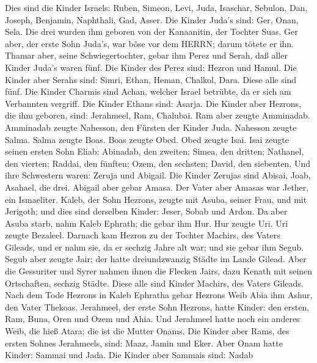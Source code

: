  Dies sind die Kinder Israels: Ruben, Simeon, Levi, Juda,
Isaschar, Sebulon,  Dan, Joseph, Benjamin, Naphthali, Gad,
Asser.  Die Kinder Juda's sind: Ger, Onan, Sela. Die drei
wurden ihm geboren von der Kanaanitin, der Tochter Suas. Ger aber, der
erste Sohn Juda's, war böse vor dem HERRN; darum tötete er ihn.
 Thamar aber, seine Schwiegertochter, gebar ihm Perez und
Serah, daß aller Kinder Juda's waren fünf.  Die Kinder des
Perez sind: Hezron und Hamul.  Die Kinder aber Serahs sind:
Simri, Ethan, Heman, Chalkol, Dara. Diese alle sind fünf. 
Die Kinder Charmis sind Achan, welcher Israel betrübte, da er sich am
Verbannten vergriff.  Die Kinder Ethans sind: Asarja.
 Die Kinder aber Hezrons, die ihm geboren, sind: Jerahmeel,
Ram, Chalubai.  Ram aber zeugte Amminadab. Amminadab zeugte
Nahesson, den Fürsten der Kinder Juda.  Nahesson zeugte
Salma. Salma zeugte Boas.  Boas zeugte Obed. Obed zeugte
Isai.  Isai zeugte seinen ersten Sohn Eliab; Abinadab, den
zweiten; Simea, den dritten;  Nathanel, den vierten;
Raddai, den fünften;  Ozem, den sechsten; David, den
siebenten.  Und ihre Schwestern waren: Zeruja und Abigail.
Die Kinder Zerujas sind Abisai, Joab, Asahael, die drei. 
Abigail aber gebar Amasa. Der Vater aber Amasas war Jether, ein
Ismaeliter.  Kaleb, der Sohn Hezrons, zeugte mit Asuba,
seiner Frau, und mit Jerigoth; und dies sind derselben Kinder: Jeser,
Sobab und Ardon.  Da aber Asuba starb, nahm Kaleb Ephrath;
die gebar ihm Hur.  Hur zeugte Uri. Uri zeugte Bezaleel.
 Darnach kam Hezron zu der Tochter Machirs, des Vaters
Gileads, und er nahm sie, da er sechzig Jahre alt war; und sie gebar ihm
Segub.  Segub aber zeugte Jair; der hatte dreiundzwanzig
Städte im Lande Gilead.  Aber die Gessuriter und Syrer
nahmen ihnen die Flecken Jairs, dazu Kenath mit seinen Ortschaften,
sechzig Städte. Diese alle sind Kinder Machirs, des Vaters Gileads.
 Nach dem Tode Hezrons in Kaleb Ephratha gebar Hezrons Weib
Abia ihm Ashur, den Vater Thekoas.  Jerahmeel, der erste
Sohn Hezrons, hatte Kinder: den ersten, Ram, Buna, Oren und Ozem und
Ahia.  Und Jerahmeel hatte noch ein anderes Weib, die hieß
Atara; die ist die Mutter Onams.  Die Kinder aber Rams, des
ersten Sohnes Jerahmeels, sind: Maaz, Jamin und Eker.  Aber
Onam hatte Kinder: Sammai und Jada. Die Kinder aber Sammais sind: Nadab
